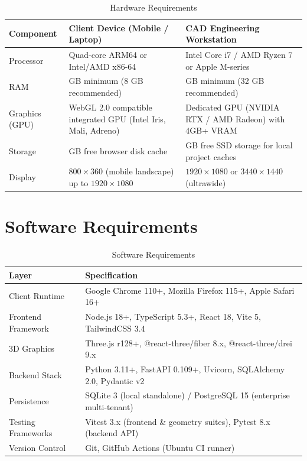 \documentclass[12pt,a4paper]{report}
\begin{document}
\begin{table}[htbp]
\centering
\small
\caption{Hardware Requirements}
\label{tab:hw}
\renewcommand{\arraystretch}{1.3}
\begin{tabularx}{\textwidth}{|>{\raggedright\arraybackslash}p{2.6cm}|>{\raggedright\arraybackslash}X|>{\raggedright\arraybackslash}X|}
\hline
\textbf{Component} & \textbf{Client Device (Mobile / Laptop)} & \textbf{CAD Engineering Workstation} \\
\hline
Processor & Quad-core ARM64 or Intel/AMD x86-64 & Intel Core i7 / AMD Ryzen 7 or Apple M-series \\
\hline
RAM & 4 GB minimum (8 GB recommended) & 16 GB minimum (32 GB recommended) \\
\hline
Graphics (GPU) & WebGL 2.0 compatible integrated GPU (Intel Iris, Mali, Adreno) & Dedicated GPU (NVIDIA RTX / AMD Radeon) with 4GB+ VRAM \\
\hline
Storage & 1 GB free browser disk cache & 10 GB free SSD storage for local project caches \\
\hline
Display & $800\times360$ (mobile landscape) up to $1920\times1080$ & $1920\times1080$ or $3440\times1440$ (ultrawide) \\
\hline
\end{tabularx}
\end{table}

\section{Software Requirements}

\begin{table}[htbp]
\centering
\small
\caption{Software Requirements}
\label{tab:sw}
\renewcommand{\arraystretch}{1.3}
\begin{tabularx}{\textwidth}{|>{\raggedright\arraybackslash}p{3.6cm}|>{\raggedright\arraybackslash}X|}
\hline
\textbf{Layer} & \textbf{Specification} \\
\hline
Client Runtime & Google Chrome 110+, Mozilla Firefox 115+, Apple Safari 16+ \\
\hline
Frontend Framework & Node.js 18+, TypeScript 5.3+, React 18, Vite 5, TailwindCSS 3.4 \\
\hline
3D Graphics & Three.js r128+, @react-three/fiber 8.x, @react-three/drei 9.x \\
\hline
Backend Stack & Python 3.11+, FastAPI 0.109+, Uvicorn, SQLAlchemy 2.0, Pydantic v2 \\
\hline
Persistence & SQLite 3 (local standalone) / PostgreSQL 15 (enterprise multi-tenant) \\
\hline
Testing Frameworks & Vitest 3.x (frontend \& geometry suites), Pytest 8.x (backend API) \\
\hline
Version Control & Git, GitHub Actions (Ubuntu CI runner) \\
\hline
\end{tabularx}
\end{table}
\end{document}

